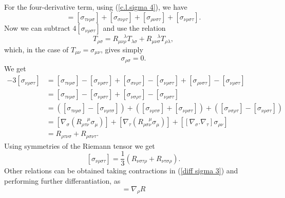 For the four-derivative term, using (\ref{c.l.sigma 4}), we have
\begin{equation}
    [\sigma_{\nu\rho\sigma\tau}] = [\sigma_{\tau\nu\rho\sigma}] + [\sigma_{\sigma\nu\rho\tau}] + [\sigma_{\rho\nu\sigma\tau}] + [\sigma_{\nu\rho\sigma\tau}].
\end{equation}
Now we can subtract $4[\sigma_{\nu\rho\sigma\tau}]$ and use the relation
\begin{equation}
    [\nabla_\mu,\nabla_\nu]T_{\rho\sigma} = R_{\mu\nu\rho}^{\;\;\;\;\lambda}T_{\lambda\sigma} + R_{\mu\nu\sigma}^{\;\;\;\;\lambda}T_{\rho\lambda},
\end{equation}
which, in the case of $T_{\mu\nu} = \sigma_{\mu\nu}$, gives simply
\begin{equation}
    [\nabla_\mu,\nabla_\mu] \sigma_{\rho\sigma}=0.
\end{equation}
We get
\begin{equation}
    \begin{split}
        -3[\sigma_{\nu\rho\sigma\tau}] &= [\sigma_{\tau\nu\rho\sigma}] - [\sigma_{\nu\rho\sigma\tau}] + [\sigma_{\sigma\nu\rho\tau}] - [\sigma_{\nu\rho\sigma\tau}] + [\sigma_{\rho\nu\sigma\tau}] - [\sigma_{\nu\rho\sigma\tau}]\\
        &= [\sigma_{\tau\nu\rho\sigma}] - [\sigma_{\nu\rho\sigma\tau}] + [\sigma_{\nu\sigma\rho\tau}] - [\sigma_{\nu\rho\sigma\tau}]\\
        &= ([\sigma_{\tau\nu\rho\sigma}] - [\sigma_{\nu\rho\tau\sigma}]) + ([\sigma_{\nu\rho\tau\sigma}] +[\sigma_{\nu\rho\sigma\tau}]) + ([\sigma_{\nu\sigma\rho\tau}] - [\sigma_{\nu\rho\sigma\tau}])\\
        &= [\nabla_\sigma(R_{\rho\tau\nu}^{\;\;\;\;\mu}\sigma_{\mu})] + [\nabla_\tau(R_{\rho\sigma\nu}^{\;\;\;\;\mu}\sigma_{\mu})] +[[\nabla_\sigma.\nabla_\tau]\sigma_{\rho\nu}]\\
        &= R_{\rho\tau\nu\sigma} + R_{\rho\sigma\nu\tau}.
    \end{split}
\end{equation}
Using symmetries of the Riemann tensor we get
\begin{equation}\label{c.l.sigma 5}
    [\sigma_{\nu\rho\sigma\tau}] = \frac{1}{3}(R_{\nu\sigma\tau\rho} + R_{\nu\tau\sigma\rho}).
\end{equation}
Other relations can be obtained taking contractions in (\ref{diff sigma 3}) and performing further differantiation, as
\begin{equation}
    [\sigma_{\nu\,\;\sigma\,\;\rho}^{\,\;\nu\,\;\sigma}] = \nabla_\rho R
\end{equation}
